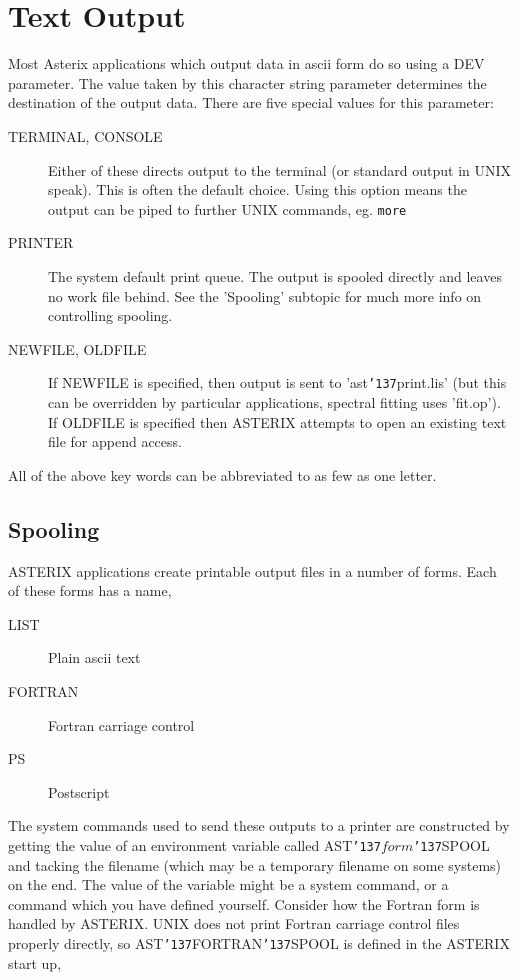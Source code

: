 \documentclass{book}
\renewcommand{\_}{{\tt\char'137}}     %
\begin{document}
\section{Text Output}
Most Asterix applications which output data in ascii form do so using
a DEV parameter. The value taken by this character string parameter
determines the destination of the output data. There are five special
values for this parameter:
 
 
\begin{description}
\item[TERMINAL, CONSOLE]
Either of these directs output to the terminal (or standard output
in UNIX speak). This is often the default choice. Using this
option means the output can be piped to
further UNIX commands, eg. {\tt more}
\item[PRINTER]
The system default print queue. The output
is spooled directly and leaves no work file
behind. See the 'Spooling' subtopic for
much more info on controlling spooling.
\item[NEWFILE, OLDFILE]
If NEWFILE is specified, then output is sent
to 'ast\_print.lis' (but this can be overridden by
particular applications, spectral
fitting uses 'fit.op'). If OLDFILE is
specified then ASTERIX attempts to open an
existing text file for append access.
\end{description}
All of the above key words can be abbreviated to as few as one letter.
 
\subsection{Spooling}
ASTERIX applications create printable output files in a number of
forms. Each of these forms has a name,
 
 
\begin{description}
\item[LIST]
Plain ascii text
\item[FORTRAN]
Fortran carriage control
\item[PS]
Postscript
\end{description}
The system commands used to send these outputs to a printer are
constructed by getting the value of an environment variable called
AST\_$form$\_SPOOL and tacking the filename (which may be a temporary
filename on some systems) on the end. The value of the variable
might be a system command, or a command which you have defined
yourself. Consider how the Fortran form is handled by ASTERIX. UNIX
does not print Fortran carriage control files properly directly, so
AST\_FORTRAN\_SPOOL is defined in the ASTERIX start up,
 
\end{document}
